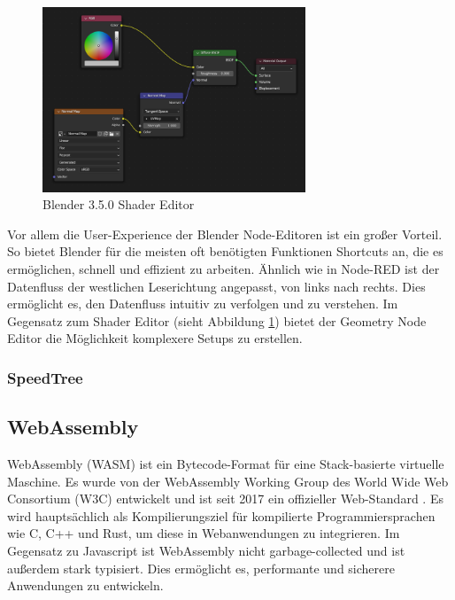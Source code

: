 \documentclass[ngerman]{article}
\begin{document}
\begin{figure}[htbp]
  \centering
  \includegraphics[width=0.7\textwidth]{./graphics/blender-shader.png}
  \caption{Blender 3.5.0 Shader Editor}
  \label{fig:blender-shader}
\end{figure}

Vor allem die User-Experience der Blender Node-Editoren ist ein großer Vorteil. So bietet Blender für die meisten oft benötigten Funktionen Shortcuts an, die es ermöglichen, schnell und effizient zu arbeiten.
\linebreak
\linebreak
Ähnlich wie in Node-RED ist der Datenfluss der westlichen Leserichtung angepasst, von links nach rechts. Dies ermöglicht es, den Datenfluss intuitiv zu verfolgen und zu verstehen.
\linebreak
\linebreak
Im Gegensatz zum Shader Editor (sieht Abbildung \ref{fig:blender-shader}) bietet der Geometry Node Editor die Möglichkeit komplexere Setups zu erstellen.


\subsubsection{SpeedTree}

\subsection{WebAssembly}
WebAssembly (WASM) ist ein Bytecode-Format für eine Stack-basierte virtuelle Maschine. Es wurde von der WebAssembly Working Group des World Wide Web Consortium (W3C) entwickelt und ist seit 2017 ein offizieller Web-Standard \cite{Haas2017}. 
\linebreak
\linebreak
Es wird hauptsächlich als Kompilierungsziel für kompilierte Programmiersprachen wie C, C++ und Rust, um diese in Webanwendungen zu integrieren. Im Gegensatz zu Javascript ist WebAssembly nicht garbage-collected und ist außerdem stark typisiert. Dies ermöglicht es, performante und sicherere Anwendungen zu entwickeln.
\end{document}
